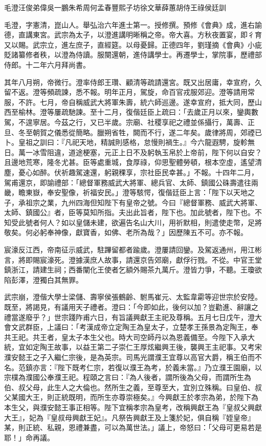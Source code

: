 
\begin{pinyinscope}
毛澄汪俊弟偉吳一鵬朱希周何孟春豐熙子坊徐文華薛蕙胡侍王祿侯廷訓

毛澄，字憲清，崑山人。舉弘治六年進士第一。授修撰。預修《會典》成，進右諭德，直講東宮。武宗為太子，以澄進講明晰稱之帝。帝大喜。方秋夜置宴，即彳育又以賜。武宗立，進左庶子，直經筵。以母憂歸。正德四年，劉瑾摘《會典》小疵貶諸纂修者秩，以澄為侍讀。服闋還朝，進侍講學士。再遷學士，掌院事，歷禮部侍郎。十二年六月拜尚書。

其年八月朔，帝微行。澄率侍郎王瓚、顧清等疏請還宮。既又出居庸，幸宣府，久留不返。澄等頻疏諫，悉不報。明年正月，駕旋，命百官戎服郊迎。澄等請用常服，不許。七月，帝自稱威武大將軍朱壽，統六師巡邊。遂幸宣府，抵大同，歷山西至榆林。澄等屢疏馳諫。至十二月，復偕廷臣上疏曰：「去歲正月以來，鑾輿數駕，不遑寧居。今茲之行，又已半歲。宗廟、社稷享祀之禮並係攝行，萬壽、正旦、冬至朝賀之儀悉從簡略。臘朔省牲，闕而不行，遂二年矣。歲律將周，郊禋已卜。皇祖之訓曰：『凡祀天地，精誠則感格，怠慢則禍生。』今六龍遐騁，旋軫無日。萬一冰雪阻違，道途梗塞，元正上日不及躬執玉帛於上帝前，陛下何以自安？且邊地荒寒，隆冬尤甚。臣等處重城，食厚祿，仰思聖體勞頓，根本空虛，遙望清塵，憂心如醉。伏祈趣駕速還，躬親稞享，宗社臣民幸甚。」不報。十四年二月，駕甫還京，即諭禮部：「總督軍務威武大將軍、總兵官、太師、鎮國公硃壽遣往兩畿，瞻東嶽，奉安聖像，祈福安民。」澄等駭愕，復偕廷臣上言：「陛下以天地之子，承祖宗之業，九州四海但知陛下有皇帝之號。今曰『總督軍務、威武大將軍、太師、鎮國公』者，臣等莫知所指。夫出此旨者，陛下也。加此號者，陛下也。不知受此號者何人？如以皇儲未建，欲遍告名山大川，用祈默相，則遣使走幣，足將敬矣。何必躬奉神像，獻寶香，如佛、老所為哉？」因歷陳五不可。亦不報。

宸濠反江西，帝南征示威武，駐蹕留都者踰歲。澄屢請回鑾。及駕返通州，用江彬言，將即賜宸濠死。澄據漢庶人故事，請還京告郊廟，獻俘行戮。不從。中官王堂鎮浙江，請建生祠；西番闡化王使者乞額外賜茶九萬斤。澄皆力爭，不聽。王瓊欲陷彭澤，澄獨白其無罪。

武宗崩，澄偕大學士梁儲、壽寧侯張鶴齡、駙馬崔元、太監韋霦等迎世宗於安陸。既至，將謁見，有議用天子禮者。澄曰：「今即如此，後何以加？豈勸進、辭讓之禮當遂廢乎？」世宗踐阼甫六日，有旨議興獻王主祀及尊稱。五月七日戊午，澄大會文武群臣，上議曰：「考漢成帝立定陶王為皇太子，立楚孝王孫景為定陶王，奉共王祀。共王者，皇太子本生父也。時大司空師丹以為恩義備至。今陛下入承大統，宜如定陶王故事，以益王第二子崇仁王厚炫繼興王後，襲興王主祀事。又考宋濮安懿王之子入繼仁宗後，是為英宗。司馬光謂濮王宜尊以高官大爵，稱王伯而不名。范鎮亦言：『陛下既考仁宗，若復以濮王為考，於義未當。』乃立濮王園廟，以宗樸為濮國公奉濮王祀。程頤之言曰：『為人後者，謂所後為父母，而謂所生為伯、叔父母，此生人之大倫也。然所生之義，至尊至大，宜別立殊稱。曰皇伯、叔父某國大王，則正統既明，而所生亦尊崇極矣。』今興獻王於孝宗為弟，於陛下為本生父，與濮安懿王事正相等。陛下宜稱孝宗為皇考，改稱興獻王為『皇叔父興獻大王』，妃為『皇叔母興獻王妃』。凡祭告興獻王及上箋於妃，俱自稱『姪皇帝』某，則正統、私親，恩禮兼盡，可以為萬世法。」議上，帝怒曰：「父母可更易若是耶！」命再議。


\end{pinyinscope}
